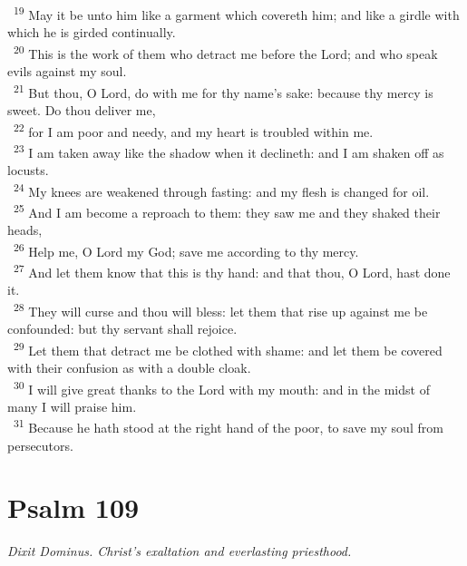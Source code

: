 \documentclass[a5paper,12pt]{article}
\begin{document}
\begin{multicols*}{2}
~\textsuperscript{19} May it be unto him like a garment which covereth him; and like a girdle with which he is girded continually.\\
~\textsuperscript{20} This is the work of them who detract me before the Lord; and who speak evils against my soul.\\
~\textsuperscript{21} But thou, O Lord, do with me for thy name's sake: because thy mercy is sweet. Do thou deliver me,\\
~\textsuperscript{22} for I am poor and needy, and my heart is troubled within me.\\
~\textsuperscript{23} I am taken away like the shadow when it declineth: and I am shaken off as locusts.\\
~\textsuperscript{24} My knees are weakened through fasting: and my flesh is changed for oil.\\
~\textsuperscript{25} And I am become a reproach to them: they saw me and they shaked their heads,\\
~\textsuperscript{26} Help me, O Lord my God; save me according to thy mercy.\\
~\textsuperscript{27} And let them know that this is thy hand: and that thou, O Lord, hast done it.\\
~\textsuperscript{28} They will curse and thou will bless: let them that rise up against me be confounded: but thy servant shall rejoice.\\
~\textsuperscript{29} Let them that detract me be clothed with shame: and let them be covered with their confusion as with a double cloak.\\
~\textsuperscript{30} I will give great thanks to the Lord with my mouth: and in the midst of many I will praise him.\\
~\textsuperscript{31} Because he hath stood at the right hand of the poor, to save my soul from persecutors.\\

\section{Psalm 109}
\label{sec:org7bc4e86}
\emph{Dixit Dominus. Christ's exaltation and everlasting priesthood.}\\


\end{multicols*}
\end{document}

